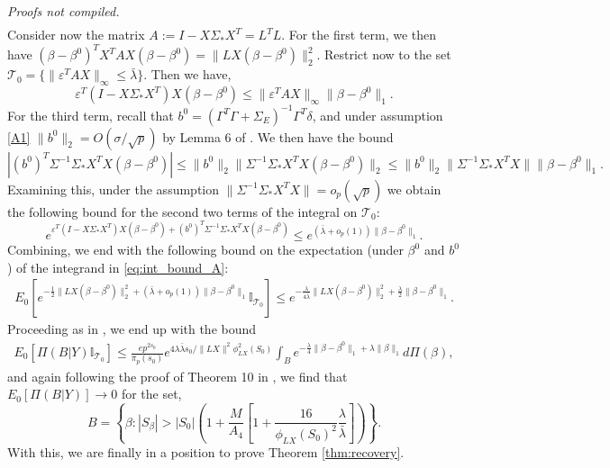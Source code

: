 \documentclass[11pt]{article}
\renewenvironment{proof}[1]{\par\noindent{\bf #1 \ }}{\hfill\BlackBox\\[2mm]}
\renewenvironment{proof}[1]{\textit{Proofs not compiled.}}{}
\newcommand{\eps}{\varepsilon}
\newcommand{\bezero}{\beta^0}
\newcommand{\postCov}{\Sigma_*}
\numberwithin{equation}{section}
\begin{document}
\begin{proof}{Proof of Theorem \ref{thm:dimension}.}
\begin{align}
	\end{align}
	Consider now the matrix $A := I - X\postCov X^T = L^TL$. For the first term, we then have $(\beta - \bezero)^TX^TAX(\beta - \bezero) = \|LX(\beta - \bezero)\|_2^2$. Restrict now to the set $\mathcal{T}_0 = \{\|\eps^TAX\|_\infty \leq \bar{\lambda}\}$. Then we have,
$$
\eps^T (I - X\postCov  X^T)X(\beta - \bezero) \leq \|\eps^T AX\|_\infty\|\beta - \bezero\|_1.
$$
For the third term, recall that $b^0 = (\Gamma^T\Gamma + \Sigma_E)^{-1} \Gamma^T \delta$, and under assumption \eqref{A1} $\|b^0\|_2 = O(\sigma/\sqrt{p})$ by Lemma 6 of \cite{CBM2020}. We then have the bound
$$
|(b^0)^T\Sigma^{-1}\postCov  X^TX (\beta - \bezero)| \leq \|b^0\|_2 \|\Sigma^{-1}\postCov  X^TX (\beta - \bezero) \|_2 \leq \|b^0\|_2\|\Sigma^{-1}\postCov  X^TX\| \|\beta - \bezero\|_1.
$$
Examining this, under the assumption {\color{assumption} $\|\Sigma^{-1} \postCov  X^TX\| = o_p(\sqrt{p})$} we obtain the following bound for the second two terms of the integral on $\mathcal{T}_0:$
$$
e^{\eps^T (I - X\postCov  X^T)X(\beta - \bezero) +(b^0)^T\Sigma^{-1}\postCov  X^TX (\beta - \bezero)} \leq e^{(\bar{\lambda} + o_p(1) )\|\beta - \bezero\|_1}.
$$
Combining, we end with the following bound on the expectation (under $\bezero$ and $b^0$) of the integrand in \eqref{eq:int_bound_A}:
\begin{align*}
E_0\left[e^{-\frac{1}{2}\|LX(\beta - \bezero)\|_2^2 + (\bar{\lambda}+o_p(1))\|\beta - \bezero\|_1} \mathbb{I}_{\mathcal{T}_0}\right] \leq e^{-\frac{\lambda}{4\bar{\lambda}}\|LX(\beta - \bezero)\|_2^2 + \frac{\lambda}{2}\|\beta - \bezero\|_1}.
\end{align*}
Proceeding as in \cite{CS-HV2015}, we end up with the bound
\begin{align*}
E_0\left[\Pi(B | Y) \mathbb{I}_{\mathcal{T}_0 }\right] \leq  \frac{e p^{2s_0}}{\pi_p(s_0)}e^{4\lambda \bar{\lambda}s_0 / \|LX\|^2\phi^2_{LX}(S_0)} \int_B e^{-\frac{\lambda}{4} \|\beta - \bezero\|_1 + \lambda\|\beta\|_1} d\Pi(\beta),
\end{align*}
and again following the proof of Theorem 10 in \cite{CS-HV2015}, we find that $E_0\left[\Pi( B | Y) \right] \rightarrow 0$ for the set,
$$
B = \left\{\beta: |S_\beta| > |S_0|\left(1 + \frac{M}{A_4}\left[1 + \frac{16}{\phi_{LX}(S_0)^2}\frac{\lambda}{\bar{\lambda}} \right]\right)\right\}.
$$
\end{proof}
With this, we are finally in a position to prove Theorem \ref{thm:recovery}. \\
\end{document}
